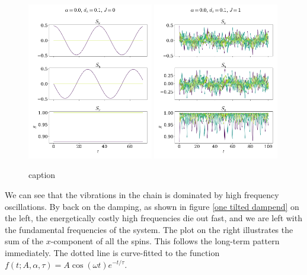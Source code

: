 \documentclass{article}
\begin{document}
    \begin{figure}
        \centering
        \includegraphics[width=0.49\textwidth]{../plots/2221.pdf}
        \includegraphics[width=0.49\textwidth]{../plots/2222.pdf}
        \caption{caption}
        \label{one tilted}
    \end{figure}

    We can see that the vibrations in the chain is dominated by high frequency oscillations. By back on the damping, as shown in figure \ref{one tilted dampend} on the left, the energetically costly high frequencies die out fast, and we are left with the fundamental frequencies of the system. The plot on the right illustrates the sum of the $x$-component of all the spins. This follows the long-term pattern immediately. The dotted line is curve-fitted to the function $f(t; A, \alpha, \tau) = A \cos(\omega t) e^{-t/\tau}$.
\end{document}
